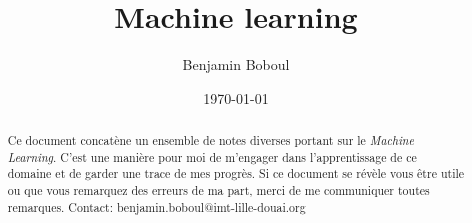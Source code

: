 \documentclass{report}
\title{Machine learning}
\author{Benjamin Boboul}
\date{\today}
\begin{document}
	\maketitle

	\begin{abstract}
	Ce document concatène un ensemble de notes diverses portant sur le \textit{Machine Learning}.
	C'est une manière pour moi de m'engager dans l'apprentissage de ce domaine et de garder une trace de mes progrès.
	Si ce document se révèle vous être utile ou que vous remarquez des erreurs de ma part, merci de me communiquer toutes remarques.
	Contact: benjamin.boboul@imt-lille-douai.org
	\end{abstract}


	
	
	
	
	
	
	

	\tableofcontents
	\printglossaries
\end{document}
